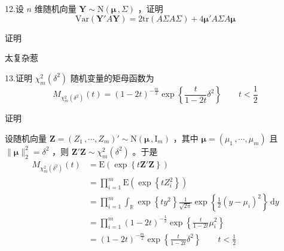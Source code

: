 \documentclass[12pt,hyperref,]{ctexart}
\begin{document}
\vspace{3em}

\kaishu

12.设 \(n\) 维随机向量
\(\boldsymbol{Y}\sim \mathrm{N}(\boldsymbol{\mu}\, ,\Sigma)\) ，证明
\begin{equation*}
\mathrm{Var}(\boldsymbol{Y}'A\boldsymbol{Y})=2\mathrm{tr}(A\Sigma A\Sigma)+4\boldsymbol{\mu}'A\Sigma A\boldsymbol{\mu}
\end{equation*}

\vspace{1em}

\heiti

证明

\songti

太复杂惹

\vspace{3em}

\kaishu

13.证明 \(\chi_{m}^2(\delta^2)\) 随机变量的矩母函数为 \begin{equation*}
M_{\chi_{m}^2(\delta^2)}(t)=(1-2t)^{-\frac m2}\exp\left\{\frac{t}{1-2t}\delta^2\right\} \qquad t<\frac{1}{2}
\end{equation*}

\vspace{1em}

\heiti

证明

\songti

设随机向量
\(\boldsymbol{Z}=(Z_1\, ,\cdots ,Z_m)'\sim \mathrm{N}(\boldsymbol{\mu}\, ,\mathrm{I}_m)\)
，其中 \(\boldsymbol{\mu}=(\mu_1\, ,\cdots ,\mu_m)\) 且
\(\|\boldsymbol{\mu}\|_2^2=\delta^2\) ，则
\(\boldsymbol{Z}'\boldsymbol{Z}\sim \chi_{m}^2(\delta^2)\) 。于是
\begin{equation*}
\begin{aligned}
M_{\chi_{m}^2(\delta^2)}(t) &= \mathrm{E}\left(\exp\left\{t\boldsymbol{Z}'\boldsymbol{Z}\right\}\right) \\
&= \prod_{i=1}^m\mathrm{E}\left(\exp\left\{tZ_i^2\right\}\right) \\
&= \prod_{i=1}^m \int_{\mathbb{R}}\exp\left\{ty^2\right\}\frac{1}{\sqrt{2\pi}}\exp\left\{\frac{1}{2}(y-\mu_i)^2\right\} \, \mathrm{d}y \\
&= \prod_{i=1}^m (1-2t)^{-\frac 12}\exp\left\{\frac{t}{1-2t}\mu_i^2\right\} \\
&= (1-2t)^{-\frac m2}\exp\left\{\frac{t}{1-2t}\delta^2\right\} \qquad t<\frac{1}{2}
\end{aligned}
\end{equation*}
\end{document}
